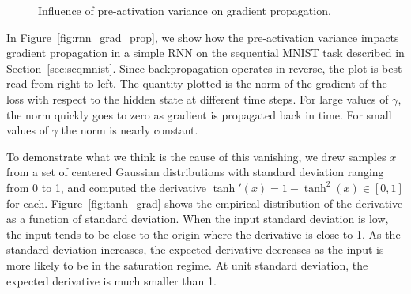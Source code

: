 \documentclass{article} %
\begin{document}
\begin{figure}[!ht]
  \center%
  \hspace{2mm}%
  \caption{
Influence of pre-activation variance on gradient propagation.
}
  \label{fig:variance}
\end{figure}

In Figure~\ref{fig:rnn_grad_prop}, we show how the pre-activation variance
impacts gradient propagation in a simple RNN on the sequential MNIST task
described in Section~\ref{sec:seqmnist}.  Since backpropagation operates in
reverse, the plot is best read from right to left.  The quantity plotted is the
norm of the gradient of the loss with respect to the hidden state at different
time steps.  For large values of $\gamma$, the norm quickly goes to zero as
gradient is propagated back in time.  For small values of $\gamma$ the norm is
nearly constant.

To demonstrate what we think is the cause of this vanishing, we drew samples
$x$ from a set of centered Gaussian distributions with standard deviation
ranging from 0 to 1, and computed the derivative $\tanh'(x) = 1 - \tanh^2(x)
\in [0, 1]$ for each.  Figure~\ref{fig:tanh_grad} shows the empirical
distribution of the derivative as a function of standard deviation.  When the
input standard deviation is low, the input tends to be close to the origin
where the derivative is close to 1.  As the standard deviation increases, the
expected derivative decreases as the input is more likely to be in the
saturation regime.  At unit standard deviation, the expected derivative is much
smaller than 1.
\end{document}
